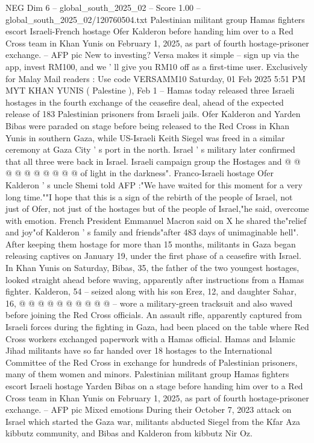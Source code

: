 \begin{textsample}{NEG Dim 6 – global\_south\_2025\_02 – Score 1.00 – global\_south\_2025\_02/120760504.txt}  \label{ex:f6_neg_044}
Palestinian militant group Hamas fighters escort Israeli-French hostage Ofer Kalderon before handing him over to a Red Cross team in Khan Yunis on February 1, 2025, as part of fourth hostage-prisoner exchange. -- AFP pic New to investing?
Versa makes it simple -- sign up via the app, invest RM100, and we ' ll give you RM10 off as a first-time user.
Exclusively for Malay Mail readers : Use code VERSAMM10 Saturday, 01 Feb 2025 5:51 PM MYT KHAN YUNIS ( Palestine ), Feb 1 -- Hamas today released three Israeli hostages in the fourth exchange of the ceasefire deal, ahead of the expected release of 183 Palestinian prisoners from Israeli jails.
Ofer Kalderon and Yarden Bibas were paraded on stage before being released to the Red Cross in Khan Yunis in southern Gaza, while US-Israeli Keith Siegel was freed in a similar ceremony at Gaza City ' s port in the north.
Israel ' s military later confirmed that all three were back in Israel.
Israeli campaign group the Hostages and @ @ @ @ @ @ @ @ @ @ of light in the darkness".
Franco-Israeli hostage Ofer Kalderon ' s uncle Shemi told AFP :"We have waited for this moment for a very long time.""I hope that this is a sign of the rebirth of the people of Israel, not just of Ofer, not just of the hostages but of the people of Israel,"he said, overcome with emotion.
French President Emmanuel Macron said on X he shared the"relief and joy"of Kalderon ' s family and friends"after 483 days of unimaginable hell".
After keeping them hostage for more than 15 months, militants in Gaza began releasing captives on January 19, under the first phase of a ceasefire with Israel.
In Khan Yunis on Saturday, Bibas, 35, the father of the two youngest hostages, looked straight ahead before waving, apparently after instructions from a Hamas fighter.
Kalderon, 54 -- seized along with his son Erez, 12, and daughter Sahar, 16, @ @ @ @ @ @ @ @ @ @ -- wore a military-green tracksuit and also waved before joining the Red Cross officials.
An assault rifle, apparently captured from Israeli forces during the fighting in Gaza, had been placed on the table where Red Cross workers exchanged paperwork with a Hamas official.
Hamas and Islamic Jihad militants have so far handed over 18 hostages to the International Committee of the Red Cross in exchange for hundreds of Palestinian prisoners, many of them women and minors.
Palestinian militant group Hamas fighters escort Israeli hostage Yarden Bibas on a stage before handing him over to a Red Cross team in Khan Yunis on February 1, 2025, as part of fourth hostage-prisoner exchange. -- AFP pic Mixed emotions During their October 7, 2023 attack on Israel which started the Gaza war, militants abducted Siegel from the Kfar Aza kibbutz community, and Bibas and Kalderon from kibbutz Nir Oz.

\end{textsample}
